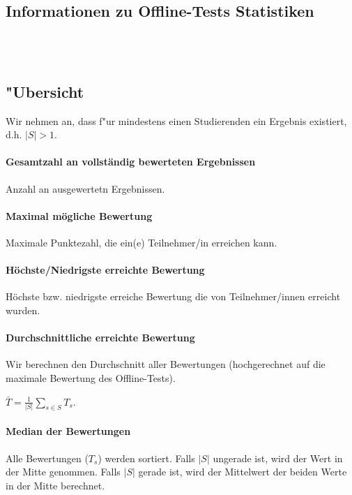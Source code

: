 \documentclass[12pt]{report}
\begin{document}
\subsection{Informationen zu Offline-Tests Statistiken}

\ \\
\ \\

\subsection{"Ubersicht}
\label{subsubsec:overview}

Wir nehmen an, dass f"ur mindestens einen Studierenden ein Ergebnis existiert, d.h. $|S|>1$.

\paragraph{Gesamtzahl an vollständig bewerteten Ergebnissen}
Anzahl an ausgewertetn Ergebnissen.

\paragraph{Maximal mögliche Bewertung}
Maximale Punktezahl, die ein(e) Teilnehmer/in erreichen kann.

\paragraph{Höchste/Niedrigste erreichte Bewertung}
Höchste bzw. niedrigste erreiche Bewertung die von Teilnehmer/innen erreicht wurden.

\paragraph{Durchschnittliche erreichte Bewertung}
Wir berechnen den Durchschnitt aller Bewertungen (hochgerechnet auf die maximale Bewertung des Offline-Tests).

$\bar{T}=\frac{1}{|S|}\sum\limits_{s\in S}T_s$.

\paragraph{Median der Bewertungen}
Alle Bewertungen ($T_s$) werden sortiert. Falls $|S|$ ungerade ist, wird der Wert in der Mitte genommen. Falls $|S|$ gerade ist, wird der Mittelwert der beiden Werte in der Mitte berechnet. 
\end{document}
